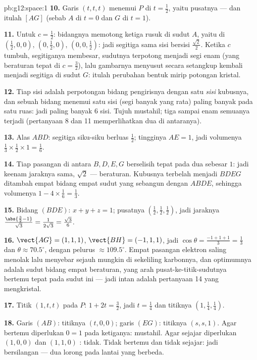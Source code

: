 \begin{solution}{pb:g12:space:1}
\textbf{10.} Garis $(t,t,t)$ menemui $P$ di $t = \frac12$, yaitu pusatnya
--- dan itulah  $[AG]$ (sebab $A$ di $t = 0$ dan $G$ di
$t = 1$).

\textbf{11.} Untuk $c = \frac12$: bidangnya memotong ketiga rusuk
di sudut $A$, yaitu di $\left(\frac12,0,0\right)$,
$\left(0,\frac12,0\right)$, $\left(0,0,\frac12\right)$: jadi
segitiga sama sisi bersisi $\frac{\sqrt2}{2}$. Ketika $c$ tumbuh,
segitiganya membesar, sudutnya terpotong menjadi segi enam
(yang beraturan tepat di $c = \frac32$), lalu gambarnya menyusut
secara setangkup kembali menjadi segitiga di sudut $G$: itulah
perubahan bentuk mirip potongan kristal.

\textbf{12.} Tiap sisi  adalah perpotongan
bidang pengirisnya dengan satu \emph{sisi} kubusnya, dan sebuah
bidang menemui satu sisi (segi banyak yang rata) paling banyak pada satu ruas:
jadi paling banyak $6$ sisi. Tujuh mustahil; tiga sampai enam semuanya
terjadi (pertanyaan 8 dan 11 memperlihatkan dua di antaranya).

\textbf{13.} Alas $ABD$: segitiga siku-siku berluas $\frac12$;
tingginya $AE = 1$, jadi volumenya
$\frac13 \times \frac12 \times 1 = \frac16$.

\textbf{14.} Tiap pasangan di antara $B, D, E, G$ berselisih tepat pada
dua  sebesar $1$: jadi keenam jaraknya sama, $\sqrt2$ ---
beraturan. Kubusnya terbelah menjadi $BDEG$ ditambah empat bidang empat
sudut yang sebangun dengan $ABDE$, sehingga volumenya
$1 - 4 \times \frac16 = \frac13$.

\textbf{15.} Bidang $(BDE)$: $x + y + z = 1$; pusatnya
$\left(\frac12,\frac12,\frac12\right)$, jadi jaraknya
$\frac{\abs{\frac32 - 1}}{\sqrt3} = \frac{1}{2\sqrt3} =
\frac{\sqrt3}{6}$.

\textbf{16.} $\vect{AG} = (1,1,1)$,
$\vect{BH} = (-1,1,1)$, jadi $\cos\theta = \frac{-1 + 1 + 1}{3} =
\frac13$ dan $\theta \approx 70.5^\circ$, dengan pelurus
$\approx 109.5^\circ$. Empat pasangan elektron saling menolak
lalu menyebar sejauh mungkin di sekeliling karbonnya, dan
optimumnya adalah sudut bidang empat beraturan, yang
arah pusat-ke-titik-sudutnya bertemu tepat pada sudut ini ---
jadi intan adalah pertanyaan 14 yang mengkristal.

\textbf{17.} Titik $(1, t, t)$ pada $P$: $1 + 2t = \frac32$, jadi
$t = \frac14$ dan titiknya $\left(1, \frac14, \frac14\right)$.

\textbf{18.} Garis $(AB)$: titiknya $(t, 0, 0)$; garis $(EG)$: titiknya
$(s, s, 1)$. Agar bertemu diperlukan $0 = 1$ pada 
ketiganya: mustahil. Agar sejajar diperlukan $(1,0,0)$ dan
$(1,1,0)$ : tidak. Tidak bertemu dan tidak sejajar: jadi bersilangan
--- dua lorong pada lantai yang berbeda.


\end{solution}
